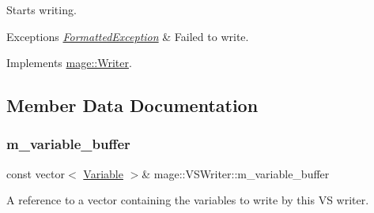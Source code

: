 Starts writing.


\begin{DoxyExceptions}{Exceptions}
{\em \hyperlink{classmage_1_1_formatted_exception}{Formatted\+Exception}} & Failed to write. \\
\hline
\end{DoxyExceptions}


Implements \hyperlink{classmage_1_1_writer_a9baf695ef7f6180bef883f60bcb3ac07}{mage\+::\+Writer}.



\subsection{Member Data Documentation}
\hypertarget{classmage_1_1_v_s_writer_a4f36e6a94d4fd8d3038f189a76582abe}{}\label{classmage_1_1_v_s_writer_a4f36e6a94d4fd8d3038f189a76582abe} 
\subsubsection{\texorpdfstring{m\+\_\+variable\+\_\+buffer}{m\_variable\_buffer}}
{\footnotesize\ttfamily const vector$<$ \hyperlink{structmage_1_1_variable}{Variable} $>$\& mage\+::\+V\+S\+Writer\+::m\+\_\+variable\+\_\+buffer\hspace{0.3cm}{\ttfamily [private]}}

A reference to a vector containing the variables to write by this VS writer. 
